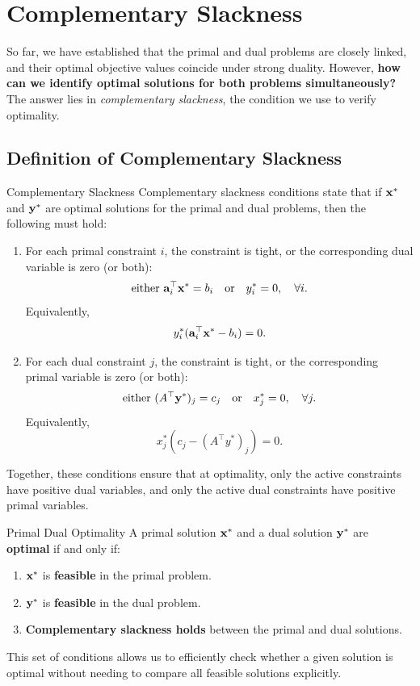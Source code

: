 \section{Complementary Slackness}
\label{sec:complementary-slackness}

So far, we have established that the primal and dual problems are closely linked, and their optimal objective values coincide under strong duality. However, 	\textbf{how can we identify optimal solutions for both problems simultaneously?} The answer lies in 	\textit{complementary slackness}, the condition we use to verify optimality.

\subsection{Definition of Complementary Slackness}
\begin{definition}{Complementary Slackness}
Complementary slackness conditions state that if \( \mathbf{x}^* \) and \( \mathbf{y}^* \) are optimal solutions for the primal and dual problems, then the following must hold:

\begin{enumerate}
\item For each primal constraint \( i \), the constraint is tight, or the corresponding dual variable is zero (or both):
\[
\mbox{either } \mathbf{a}_i^\top \mathbf{x}^* = b_i \quad \mbox{or} \quad y_i^* = 0, \quad \forall i.
\]
Equivalently, 
\[
y_i^* (\mathbf{a}_i^\top \mathbf{x}^* - b_i) = 0.
\]

\item For each dual constraint \( j \), the constraint is tight, or the corresponding primal variable is zero (or both):
\[
\mbox{either } (A^\top \mathbf{y}^*)_j = c_j \quad \mbox{or} \quad x_j^* = 0, \quad \forall j.
\]
Equivalently, 
\[
x_j^* (c_j - (A^\top y^*)_j) = 0.
\]
\end{enumerate}
\end{definition}

Together, these conditions ensure that at optimality, only the active constraints have positive dual variables, and only the active dual constraints have positive primal variables.
\begin{theorem}{Primal Dual Optimality}\label{thm:cs-optimality}
A primal solution $\mathbf{x}^*$ and a dual solution $\mathbf{y}^*$ are 	\textbf{optimal} if and only if:
\begin{enumerate}
\item $\mathbf{x}^*$ is 	\textbf{feasible} in the primal problem.
\item $\mathbf{y}^*$ is 	\textbf{feasible} in the dual problem.
\item 	\textbf{Complementary slackness holds} between the primal and dual solutions.
\end{enumerate}
\end{theorem}
This set of conditions allows us to efficiently check whether a given solution is optimal without needing to compare all feasible solutions explicitly.

